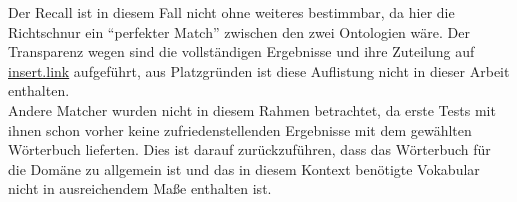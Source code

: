 		Der Recall ist in diesem Fall nicht ohne weiteres bestimmbar, da hier die
		Richtschnur ein "`perfekter Match"' zwischen den zwei Ontologien wäre.
		Der Transparenz wegen sind die vollständigen Ergebnisse und ihre Zuteilung auf
		\url{insert.link} aufgeführt, aus Platzgründen ist diese Auflistung nicht in
		dieser Arbeit enthalten.\\
		Andere Matcher wurden nicht in diesem Rahmen betrachtet, da erste Tests mit
		ihnen schon vorher keine zufriedenstellenden Ergebnisse mit dem gewählten
		Wörterbuch lieferten.
		Dies ist darauf zurückzuführen, dass das Wörterbuch für die Domäne zu
		allgemein ist und das in diesem Kontext benötigte Vokabular nicht in
		ausreichendem Maße enthalten ist.
		
		\pagebreak[4]